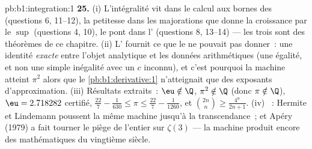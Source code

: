 \begin{solution}{pb:b1:integration:1}
\textbf{25.} (i) L'intégralité vit dans le calcul aux bornes des
 (questions 6, 11--12), la petitesse dans les majorations
que donne la croissance par le $\sup$ (questions 4, 10), le pont dans
l' (questions 8, 13--14) --- les trois sont
des théorèmes de ce chapitre. (ii) L' fournit ce que le
 ne pouvait pas donner~: une
identité \emph{exacte} entre l'objet analytique et les données
arithmétiques (une égalité, et non une simple inégalité avec un $c$
inconnu), et c'est pourquoi la machine atteint $\pi^2$ alors que le
\cref{pb:b1:derivative:1} n'atteignait que des exposants
d'approximation. (iii) Résultats extraits~: $\eu \notin \Q$,
$\pi^2 \notin \Q$ (donc $\pi \notin \Q$), $\eu = 2.718282$
certifié, $\frac{22}{7} - \frac{1}{630} \leq \pi \leq
\frac{22}{7} - \frac{1}{1260}$, et $\binom{2n}{n} \geq
\frac{4^n}{2n+1}$. (iv) ~: Hermite et Lindemann poussent
la même machine jusqu'à la transcendance~; et Apéry (1979) a fait
tourner le piège de l'entier sur $\zeta(3)$ --- la machine produit
encore des mathématiques du vingtième siècle.
\end{solution}
